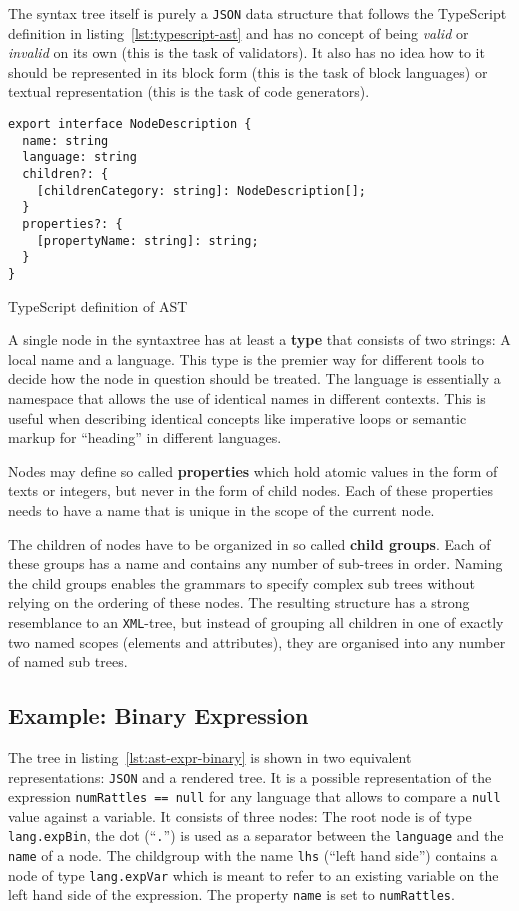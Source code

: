 \documentclass[sigconf,natbib=false,review=true,anonymous]{acmart}
\begin{document}
The syntax tree itself is purely a \texttt{JSON} data structure that follows the TypeScript definition in listing~\ref{lst:typescript-ast} and has no concept of being \textit{valid} or \textit{invalid} on its own (this is the task of validators). It also has no idea how to it should be represented in its block form (this is the task of block languages) or textual representation (this is the task of code generators).

\begin{listing}[H]
\begin{verbatim}
export interface NodeDescription {
  name: string
  language: string
  children?: {
    [childrenCategory: string]: NodeDescription[];
  }
  properties?: {
    [propertyName: string]: string;
  }
}
\end{verbatim}
\caption{TypeScript definition of AST}
\label{lst:typescript-ast}
\end{listing}

A single node in the syntaxtree has at least a \textbf{type} that consists of two strings: A local name and a language. This type is the premier way for different tools to decide how the node in question should be treated. The language is essentially a namespace that allows the use of identical names in different contexts. This is useful when describing identical concepts like imperative loops or semantic markup for \enquote{heading} in different languages.

Nodes may define so called \textbf{properties} which hold atomic values in the form of texts or integers, but never in the form of child nodes. Each of these properties needs to have a name that is unique in the scope of the current node.

The children of nodes have to be organized in so called \textbf{child groups}. Each of these groups has a name and contains any number of sub-trees in order. Naming the child groups enables the grammars to specify complex sub trees without relying on the ordering of these nodes. The resulting structure has a strong resemblance to an \texttt{XML}-tree, but instead of grouping all children in one of exactly two named scopes (elements and attributes), they are organised into any number of named sub trees.

\subsection{Example: Binary Expression}

The tree in listing~\ref{lst:ast-expr-binary} is shown in two equivalent representations: \texttt{JSON} and a rendered tree. It is a possible representation of the expression \texttt{numRattles == null} for any language that allows to compare a \texttt{null} value against a variable. It consists of three nodes: The root node is of type \texttt{lang.expBin}, the dot (\enquote{\texttt{.}}) is used as a separator between the \texttt{language} and the \texttt{name} of a node. The childgroup with the name \texttt{lhs} (\enquote{left hand side}) contains a node of type \texttt{lang.expVar} which is meant to refer to an existing variable on the left hand side of the expression. The property \texttt{name} is set to \texttt{numRattles}.
\end{document}
